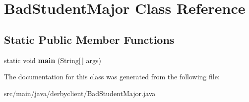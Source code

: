 \hypertarget{classBadStudentMajor}{}\section{Bad\+Student\+Major Class Reference}
\label{classBadStudentMajor}
\subsection*{Static Public Member Functions}
\begin{DoxyCompactItemize}
\item 
\mbox{\label{classBadStudentMajor_ab6a596f1bf145d0facd02904336897bd}} 
static void {\bfseries main} (String\mbox{[}$\,$\mbox{]} args)
\end{DoxyCompactItemize}


The documentation for this class was generated from the following file\+:\begin{DoxyCompactItemize}
\item 
src/main/java/derbyclient/Bad\+Student\+Major.\+java\end{DoxyCompactItemize}
